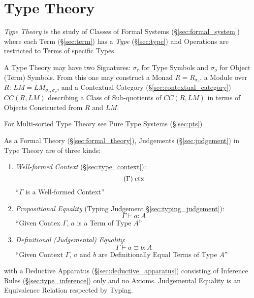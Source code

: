 \part{Type Theory}\label{part:type_theory}

\emph{Type Theory} is the study of Classes of Formal Systems
(\S\ref{sec:formal_system}) where each Term (\S\ref{sec:term}) has a
\emph{Type} (\S\ref{sec:type}) and Operations are restricted to Terms
of specific Types.

A Type Theory may have two Signatures: $\sigma_\tau$ for Type Symbols
and $\sigma_o$ for Object (Term) Symbols. From this one may construct
a Monad $R = R_{\sigma_o}$, a Module over $R$: $LM =
LM_{\sigma_\tau,\sigma_o}$, and a Contextual Category
(\S\ref{sec:contextual_category}) $CC(R,LM)$ describing a Class of
Sub-quotients of $CC(R,LM)$ in terms of Objects Constructed from $R$
and $LM$. \cite{voevedsky14}

For Multi-sorted Type Theory see Pure Type Systems
(\S\ref{sec:pts})

As a Formal Theory (\S\ref{sec:formal_theory}), Judgements
(\S\ref{sec:judgement}) in Type Theory are of three
kinds\cite{hott13}:
\begin{enumerate}

\item \emph{Well-formed Context} (\S\ref{sec:type_context}):
  \[
    (\Gamma) \;\mathrm{ctx}
  \]
  ``$\Gamma$ is a Well-formed Context''

\item \emph{Propositional Equality} (Typing Judgement
    \S\ref{sec:typing_judgement}):
  \[
    \Gamma \vdash a : A
  \]
  ``Given Contex $\Gamma$, $a$ is a Term of Type $A$''

\item \emph{Definitional (Judgemental) Equality}:
  \[
    \Gamma \vdash a \equiv b : A
  \]
  ``Given Context $\Gamma$, $a$ and $b$ are Definitionally Equal Terms
  of Type $A$''

\end{enumerate}
with a Deductive Apparatus (\S\ref{sec:deductive_apparatus})
consisting of Inference Rules (\S\ref{sec:type_inference}) only and no
Axioms. Judgemental Equality is an Equivalence Relation respected by
Typing.

